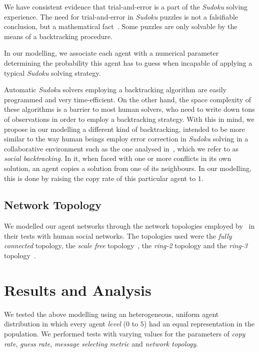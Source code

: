 \documentclass{article}
\begin{document}
We have consistent evidence that trial-and-error is a part of the {\em Sudoku} solving experience. The need for trial-and-error in {\em Sudoku} puzzles is not a falsifiable conclusion, but a mathematical fact~\cite{davis:mathsudoku}. Some puzzles are only solvable by the means of a backtracking procedure.

In our modelling, we associate each agent with a numerical parameter determining the probability this agent has to guess when incapable of applying a typical {\em Sudoku} solving strategy.

Automatic {\em Sudoku} solvers employing a backtracking algorithm are easily programmed and very time-efficient. On the other hand, the space complexity of these algorithms is a barrier to most human solvers, who need to write down tons of observations in order to employ a backtracking strategy. With this in mind, we propose in our modelling a different kind of backtracking, intended to be more similar to the way human beings employ error correction in {\em Sudoku} solving in a collaborative environment such as the one analysed in~\cite{farenzena:collabem}, which we refer to as \emph{social backtracking}. In it, when faced with one or more conflicts in its own solution, an agent copies a solution from one of its neighbours. In our modelling, this is done by raising the copy rate of this particular agent to $1$.

\subsection{Network Topology}

We modelled our agent networks through the network topologies employed by~\cite{farenzena:collabem} in their tests with human social networks. The topologies used were the {\em fully connected} topology, the {\em scale free} topology~\cite{barabasi:linked}, the {\em ring-2} topology and the {\em ring-3} topology~\cite{newman:newtorks}.

\section{Results and Analysis}

We tested the above modelling using an heterogeneous, uniform agent distribution in which every agent {\em level} ($0$ to $5$) had an equal representation in the population. We performed tests with varying values for the parameters of {\em copy rate}, {\em guess rate}, {\em message selecting metric} and {\em network topology}.
\end{document}
